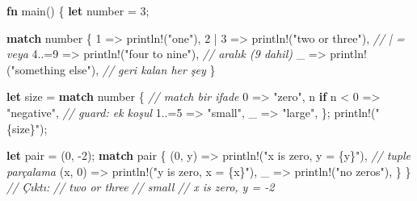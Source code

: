 \documentclass[12pt,a4paper]{article}
\newenvironment{Shaded}{}{}
\newcommand{\CommentTok}[1]{\textcolor[rgb]{0.38,0.63,0.69}{\textit{#1}}}
\newcommand{\ControlFlowTok}[1]{\textcolor[rgb]{0.00,0.44,0.13}{\textbf{#1}}}
\newcommand{\DecValTok}[1]{\textcolor[rgb]{0.25,0.63,0.44}{#1}}
\newcommand{\FunctionTok}[1]{\textcolor[rgb]{0.02,0.16,0.49}{#1}}
\newcommand{\KeywordTok}[1]{\textcolor[rgb]{0.00,0.44,0.13}{\textbf{#1}}}
\newcommand{\NormalTok}[1]{#1}
\newcommand{\OperatorTok}[1]{\textcolor[rgb]{0.40,0.40,0.40}{#1}}
\newcommand{\StringTok}[1]{\textcolor[rgb]{0.25,0.44,0.63}{#1}}
\begin{document}
\begin{Shaded}
\begin{Highlighting}[]
\KeywordTok{fn} \FunctionTok{main}\OperatorTok{()} \OperatorTok{\{}
    \KeywordTok{let}\NormalTok{ number }\OperatorTok{=} \DecValTok{3}\OperatorTok{;}

    \ControlFlowTok{match}\NormalTok{ number }\OperatorTok{\{}
        \DecValTok{1} \OperatorTok{=\textgreater{}}\NormalTok{ println}\OperatorTok{!(}\StringTok{"one"}\OperatorTok{),}
        \DecValTok{2} \OperatorTok{|} \DecValTok{3} \OperatorTok{=\textgreater{}}\NormalTok{ println}\OperatorTok{!(}\StringTok{"two or three"}\OperatorTok{),}   \CommentTok{// | = veya}
        \DecValTok{4}\OperatorTok{..=}\DecValTok{9} \OperatorTok{=\textgreater{}}\NormalTok{ println}\OperatorTok{!(}\StringTok{"four to nine"}\OperatorTok{),}   \CommentTok{// aralık (9 dahil)}
\NormalTok{        \_ }\OperatorTok{=\textgreater{}}\NormalTok{ println}\OperatorTok{!(}\StringTok{"something else"}\OperatorTok{),}     \CommentTok{// geri kalan her şey}
    \OperatorTok{\}}

    \KeywordTok{let}\NormalTok{ size }\OperatorTok{=} \ControlFlowTok{match}\NormalTok{ number }\OperatorTok{\{}                \CommentTok{// match bir ifade}
        \DecValTok{0} \OperatorTok{=\textgreater{}} \StringTok{"zero"}\OperatorTok{,}
\NormalTok{        n }\ControlFlowTok{if}\NormalTok{ n }\OperatorTok{\textless{}} \DecValTok{0} \OperatorTok{=\textgreater{}} \StringTok{"negative"}\OperatorTok{,}            \CommentTok{// guard: ek koşul}
        \DecValTok{1}\OperatorTok{..=}\DecValTok{5} \OperatorTok{=\textgreater{}} \StringTok{"small"}\OperatorTok{,}
\NormalTok{        \_ }\OperatorTok{=\textgreater{}} \StringTok{"large"}\OperatorTok{,}
    \OperatorTok{\};}
\NormalTok{    println}\OperatorTok{!(}\StringTok{"\{size\}"}\OperatorTok{);}

    \KeywordTok{let}\NormalTok{ pair }\OperatorTok{=} \OperatorTok{(}\DecValTok{0}\OperatorTok{,} \OperatorTok{-}\DecValTok{2}\OperatorTok{);}
    \ControlFlowTok{match}\NormalTok{ pair }\OperatorTok{\{}
        \OperatorTok{(}\DecValTok{0}\OperatorTok{,}\NormalTok{ y}\OperatorTok{)} \OperatorTok{=\textgreater{}}\NormalTok{ println}\OperatorTok{!(}\StringTok{"x is zero, y = \{y\}"}\OperatorTok{),}  \CommentTok{// tuple parçalama}
        \OperatorTok{(}\NormalTok{x}\OperatorTok{,} \DecValTok{0}\OperatorTok{)} \OperatorTok{=\textgreater{}}\NormalTok{ println}\OperatorTok{!(}\StringTok{"y is zero, x = \{x\}"}\OperatorTok{),}
\NormalTok{        \_ }\OperatorTok{=\textgreater{}}\NormalTok{ println}\OperatorTok{!(}\StringTok{"no zeros"}\OperatorTok{),}
    \OperatorTok{\}}
\OperatorTok{\}}
\CommentTok{// Çıktı:}
\CommentTok{// two or three}
\CommentTok{// small}
\CommentTok{// x is zero, y = -2}
\end{Highlighting}
\end{Shaded}
\end{document}
